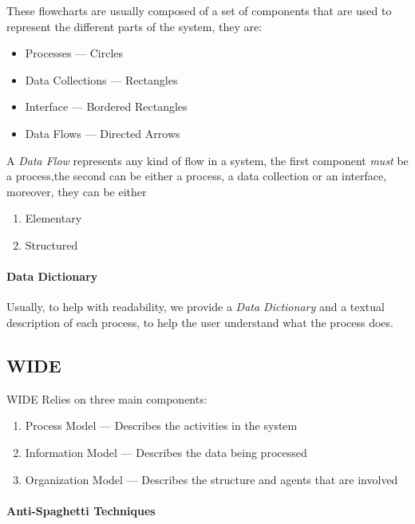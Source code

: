 \documentclass[openright, twoside, twocolumn, a4paper, 10pt]{report}
\begin{document}
These flowcharts are usually composed of a set of components that are used to represent
the different parts of the system, they are:
\begin{itemize}
	\item Processes --- Circles
	\item Data Collections --- Rectangles
	\item Interface --- Bordered Rectangles
	\item Data Flows --- Directed Arrows
\end{itemize}

\begin{definition}
	A \emph{Data Flow} represents any kind of flow in a system, the first component \emph{must}
	be a process,the second can be either a process, a data collection or an interface, moreover,
	they can be either
	\begin{enumerate}
		\item Elementary
		\item Structured
	\end{enumerate}
\end{definition}

\paragraph{Data Dictionary}

Usually, to help with readability, we provide a \emph{Data Dictionary} and a textual description of each process,
to help the user understand what the process does.

\subsection{WIDE}

WIDE Relies on three main components:

\begin{enumerate}
	\item Process Model --- Describes the activities in the system
	\item Information Model --- Describes the data being processed
	\item Organization Model --- Describes the structure and agents that are involved
\end{enumerate}

\paragraph{Anti-Spaghetti Techniques}
\end{document}
